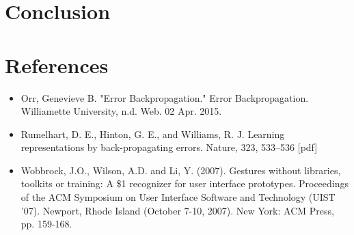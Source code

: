 \documentclass{article}
\begin{document}
\section{Conclusion}


\section{References}
\begin{itemize}
\item Orr, Genevieve B. "Error Backpropagation." Error Backpropagation. Williamette University, n.d. Web. 02 Apr. 2015.
\item Rumelhart, D. E., Hinton, G. E., and Williams, R. J. Learning representations by back-propagating errors. Nature, 323, 533--536 [pdf]
\item Wobbrock, J.O., Wilson, A.D. and Li, Y. (2007). Gestures without libraries, toolkits or training: A \$1 recognizer for user interface prototypes. Proceedings of the ACM Symposium on User Interface Software and Technology (UIST '07). Newport, Rhode Island (October 7-10, 2007). New York: ACM Press, pp. 159-168.

\end{itemize}
\end{document}
